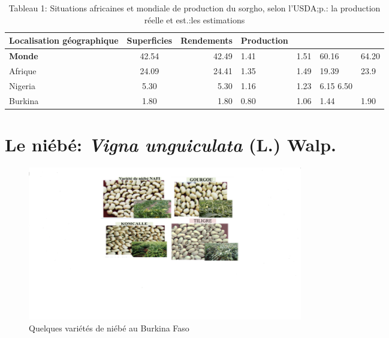 \documentclass[a4paper,11pt]{article}
\begin{document}
\begin{table}
  \begin{center}
 \begin{tabular}{|l|c|r|p{4cm}|}
    \hline
    Localisation géographique & Superficies & Rendements & Production \\ \hline
    \textbf{Monde} & 42.54 & 42.49 & 1.41 & 1.51 & 60.16 & 64.20 \\ \hline
    Afrique & 24.09 & 24.41 & 1.35 & 1.49 & 19.39 & 23.9 \\ \hline
    Nigeria & 5.30 & 5.30 & 1.16 & 1.23 & 6.15 6.50 \\ \hline
    Burkina & 1.80 & 1.80 & 0.80 & 1.06 & 1.44 & 1.90 \\ \hline
     
        
 \end{tabular}
 \caption{Tableau 1: Situations africaines et mondiale de production du sorgho, selon l’USDA;p.:
    la production réelle et est.:les estimations}
\end{center}
  \end{table}
  



\section{Le niébé: \emph{Vigna unguiculata} (L.) Walp.}
\begin{figure}%
  \begin{center}
   \includegraphics[width=12cm]{images/graines_niebe}
  \end{center}
\caption{Quelques variétés de niébé au Burkina Faso}
\end{figure}
\end{document}
